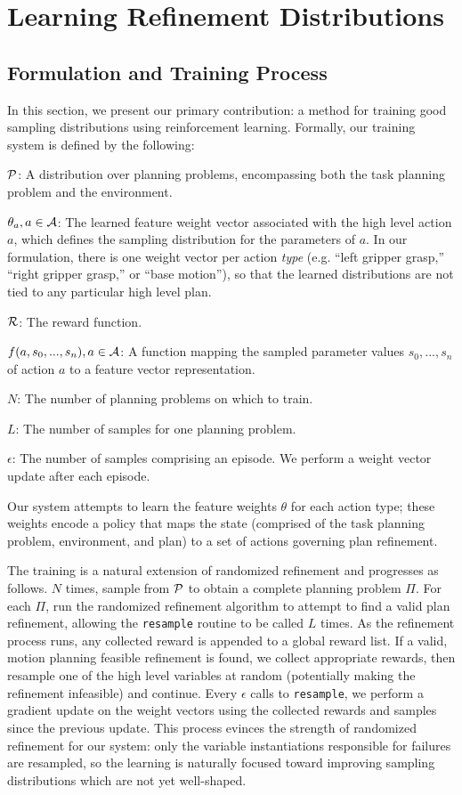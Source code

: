 \section{Learning Refinement Distributions}
\subsection{Formulation and Training Process}
In this section, we present our primary contribution: a method
for training good sampling distributions using reinforcement learning.
Formally, our training system is defined by the following:
\begin{tightlist}
\item[$\mathcal{P}$:] A distribution over planning problems, encompassing both
the task planning problem and the environment.
\item[$\theta_{a}, a \in \mathcal{A}$:] The learned feature weight vector associated with the high
level action $a$, which defines the sampling distribution for the
parameters of $a$. In our formulation, there is one
weight vector per action \emph{type} (e.g. ``left gripper grasp,'' ``right
gripper grasp,'' or ``base motion''), so that the learned distributions are
not tied to any particular high level plan.
\item[$\mathcal{R}$:] The reward function.
\item[$f(a, s_{0}, ..., s_{n}), a \in \mathcal{A}$:] A function mapping the sampled
parameter values $s_{0}, ..., s_{n}$ of action $a$ to a feature vector representation.
\item[$N$:] The number of planning problems on which to train.
\item[$L$:] The number of samples for one planning problem.
\item[$\epsilon$:] The number of samples comprising an episode. We perform
a weight vector update after each episode.
\end{tightlist}

Our system attempts to learn the feature weights $\theta$ for each action type; these weights
encode a policy that maps the state (comprised of the task planning problem, environment,
and plan) to a set of actions governing plan refinement.

The training is a natural extension of randomized
refinement and progresses as follows. $N$ times, sample from $\mathcal{P}$ to obtain
a complete planning problem $\Pi$. For each $\Pi$, run the randomized refinement
algorithm to attempt to find a valid plan refinement, allowing the \texttt{resample}
routine to be called $L$ times. As the refinement process runs, any collected
reward is appended to a global reward list. If a valid, motion planning
feasible refinement is found, we collect appropriate rewards, then resample one of
the high level variables at random (potentially making the refinement infeasible)
and continue. Every $\epsilon$ calls to
\texttt{resample}, we perform a gradient update on the weight vectors using the
collected rewards and samples since the previous update. This process
evinces the strength of randomized refinement for our system: only the variable
instantiations responsible for failures are resampled, so the learning is naturally
focused toward improving sampling distributions which are not yet well-shaped.

